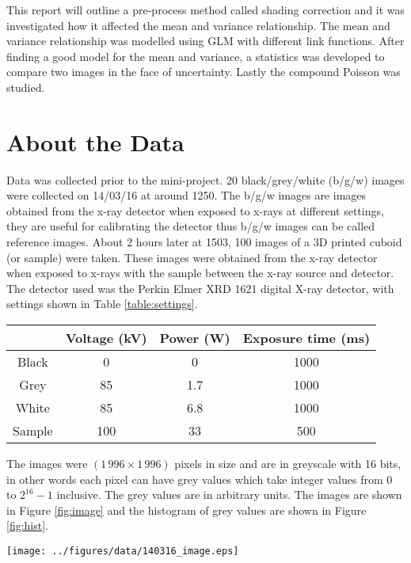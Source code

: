 \documentclass[a4paper]{proc}
\begin{document}
This report will outline a pre-process method called shading correction and it was investigated how it affected the mean and variance relationship. The mean and variance relationship was modelled using GLM with different link functions. After finding a good model for the mean and variance, a statistics was developed to compare two images in the face of uncertainty. Lastly the compound Poisson was studied.

\section{About the Data}
Data was collected prior to the mini-project. 20 black/grey/white (b/g/w) images were collected on 14/03/16 at around 1250. The b/g/w images are images obtained from the x-ray detector when exposed to x-rays at different settings, they are useful for calibrating the detector thus b/g/w images can be called reference images. About 2 hours later at 1503, 100 images of a 3D printed cuboid (or sample) were taken. These images were obtained from the x-ray detector when exposed to x-rays with the sample between the x-ray source and detector. The detector used was the Perkin Elmer XRD 1621 digital X-ray detector, with settings shown in Table \ref{table:settings}.

\begin{table*}
	\centering
	\begin{tabular}{c|c|c|c}
		& Voltage (kV) & Power (W) & Exposure time (ms) \\
		\hline
		Black & 0 & 0 & 1000\\
		Grey & 85 & 1.7 & 1000\\
		White & 85 & 6.8 & 1000 \\
		Sample & 100 & 33 & 500
	\end{tabular}
	\caption{Setting of the x-ray CT scan when collecting images from the x-ray detector. Error bars were not given and the number of significant figures shown are as given.}
	\label{table:settings}
\end{table*}

The images were $(1\,996\times1\,996)$ pixels in size and are in greyscale with 16 bits, in other words each pixel can have grey values which take integer values from 0 to $2^{16}-1$ inclusive. The grey values are in arbitrary units. The images are shown in Figure \ref{fig:image} and the histogram of grey values are shown in Figure \ref{fig:hist}.

\begin{figure*}
	\centering
	\texttt{[image: ../figures/data/140316\_image.eps]}
	\caption{A black, grey, white and sample image obtained from the x-ray detector.}
	\label{fig:image}
\end{figure*}
\end{document}
